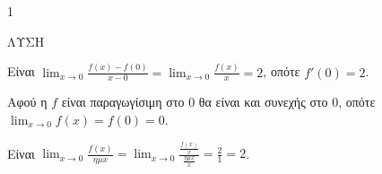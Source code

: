 \begin{ylh}{1}
    \item [Ύλη από εικόνα]
\end{ylh}
ΛΥΣΗ
\begin{alist}
\item Είναι $\lim_{x \to 0} \frac{f(x) - f(0)}{x - 0} = \lim_{x \to 0} \frac{f(x)}{x} = 2$, οπότε $f'(0) = 2$.
\item Αφού η $f$ είναι παραγωγίσιμη στο $0$ θα είναι και συνεχής στο $0$, οπότε $\lim_{x \to 0} f(x) = f(0) = 0$.
\item Είναι $\lim_{x \to 0} \frac{f(x)}{\eta\mu x} = \lim_{x \to 0} \frac{\frac{f(x)}{x}}{\frac{\eta\mu x}{x}} = \frac{2}{1} = 2$.
\end{alist}